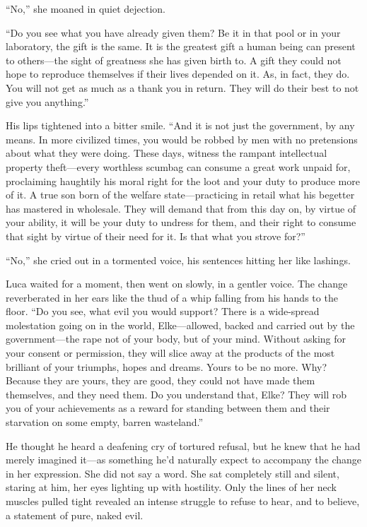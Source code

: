 ``No,'' she moaned in quiet dejection.

``Do you see what you have already given them? Be it in that pool or in your laboratory, the gift is the same. It is the greatest gift a human being can present to others---the sight of greatness she has given birth to. A gift they could not hope to reproduce themselves if their lives depended on it. As, in fact, they do. You will not get as much as a thank you in return. They will do their best to not give you anything.''

His lips tightened into a bitter smile. ``And it is not just the government, by any means. In more civilized times, you would be robbed by men with no pretensions about what they were doing. These days, witness the rampant intellectual property theft---every worthless scumbag can consume a great work unpaid for, proclaiming haughtily his moral right for the loot and your duty to produce more of it. A true son born of the welfare state---practicing in retail what his begetter has mastered in wholesale. They will demand that from this day on, by virtue of your ability, it will be your duty to undress for them, and their right to consume that sight by virtue of their need for it. Is that what you strove for?''

``No,'' she cried out in a tormented voice, his sentences hitting her like lashings.

Luca waited for a moment, then went on slowly, in a gentler voice. The change reverberated in her ears like the thud of a whip falling from his hands to the floor. ``Do you see, what evil you would support? There is a wide-spread molestation going on in the world, Elke---allowed, backed and carried out by the government---the rape not of your body, but of your mind. Without asking for your consent or permission, they will slice away at the products of the most brilliant of your triumphs, hopes and dreams. Yours to be no more. Why? Because they are yours, they are good, they could not have made them themselves, and they need them. Do you understand that, Elke? They will rob you of your achievements as a reward for standing between them and their starvation on some empty, barren wasteland.''

He thought he heard a deafening cry of tortured refusal, but he knew that he had merely imagined it---as something he'd naturally expect to accompany the change in her expression. She did not say a word. She sat completely still and silent, staring at him, her eyes lighting up with hostility. Only the lines of her neck muscles pulled tight revealed an intense struggle to refuse to hear, and to believe, a statement of pure, naked evil.

